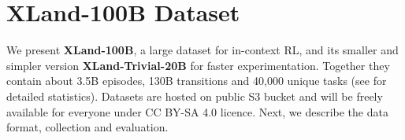 \documentclass{article}
\begin{document}

\section{XLand-100B Dataset}
\label{data}

We present \textbf{XLand-100B}, a large dataset for in-context RL, and its smaller and simpler version \textbf{XLand-Trivial-20B} for faster experimentation. Together they contain about 3.5B episodes, 130B transitions and 40,000 unique tasks (see  for detailed statistics). Datasets are hosted on public S3 bucket and will be freely available for everyone under CC BY-SA 4.0 licence. Next, we describe the data format, collection and evaluation.

\end{document}
